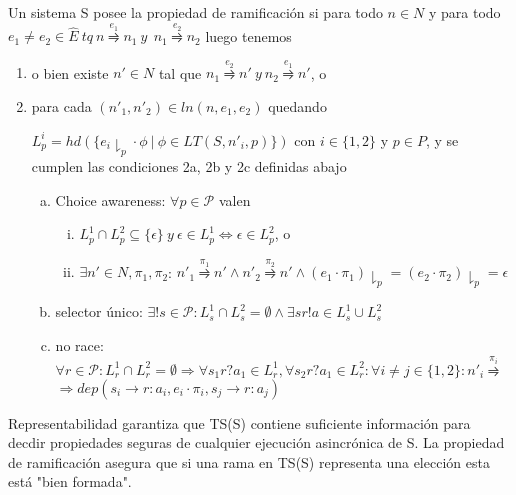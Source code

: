 \begin{definition} Un sistema S posee la propiedad de ramificación si para todo $n \in N$ y para todo $e_1 \neq e_2 \in \hat{E} \ \mathit{tq} \ n \overset{e_1}{\rightrightharpoons} n_1 \ \mathit{y} \  \ n_1 \overset{e_2}{\rightrightharpoons} n_2$ luego tenemos
\begin{enumerate}
\item o bien existe $n'\in N$ tal que $n_1 \overset{e_2}{\rightrightharpoons} n' \ \mathit{y} \ n_2 \overset{e_1}{\rightrightharpoons} n'$, o 
\item para cada $(n'_1, n'_2) \in ln(n, e_1, e_2)$ quedando 

$L_p^i = hd (\{e_i \downharpoonright_p \cdot \phi \  | \ \phi \in LT(S,n'_i,p) \} ) $ con $i \in \{1,2\}$ y $p \in P$, y se cumplen las condiciones 2a, 2b y 2c definidas abajo 	

\begin{enumerate}[(a)]
\item Choice awareness: $\forall p \in \mathcal{P}$ valen \begin{enumerate}[i.]
\item $L_p^1 \cap	L_p^2 \subseteq \{ \epsilon \} \ \mathit{y} \  \epsilon \in L_p^1 \iff \epsilon \in L_p^2$, o 
\item $\exists n' \in N, \pi_1, \pi_2$: $n'_1 \overset{\pi_1}{\rightrightharpoons} n' \land  n'_2 \overset{\pi_2}{\rightrightharpoons} n' \land (e_1 \cdot \pi_1) \downharpoonright_p= (e_2 \cdot \pi_2)\downharpoonright_p = \epsilon$
\end{enumerate}
\item selector único: $\exists!s \in \mathcal{P}: L_s^1 \cap L_s^2 = \emptyset \land \exists sr!a \in L_s^1 \cup L_s^2 $
\item no race: $\forall r \in \mathcal{P}: L_r^1\cap L_r^2 = \emptyset \Rightarrow \forall s_1r?a_1 \in L_r^1, \forall s_2r?a_1 \in L_r^2:\forall i \neq j \in \{1,2\}: n'_i \overset{\pi_i}\rightrightharpoons  $ \\
$\Rightarrow dep (s_i \rightarrow r: a_i, e_i \cdot \pi_i, s_j \rightarrow r: a_j) $
\end{enumerate}
\end{enumerate} 	
\end{definition}

Representabilidad garantiza que TS(S) contiene suficiente información para decdir propiedades seguras de cualquier ejecución asincrónica de S. La propiedad de ramificación asegura que si una rama en TS(S) representa una elección esta está "bien formada".\\
 
